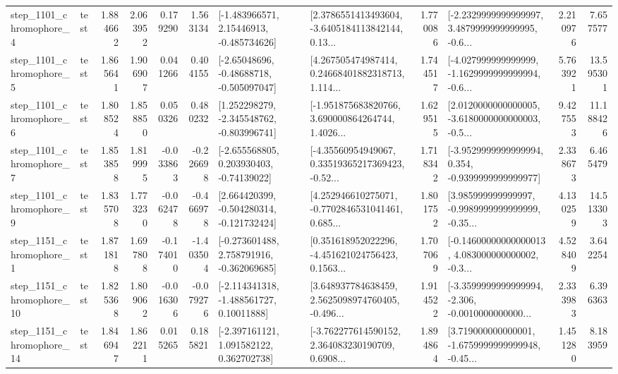 \begin{tabular}{llrrrrllrlrr}
  step\_1101\_chromophore\_4 &      test &      1.884662 &    2.063952 &      0.179290 &  1.563134 &    [-1.483966571, 2.15446913, -0.485734626] &  [2.3786551413493604, -3.6405184113842144, 0.13... &       1.770086 &  [-2.2329999999999997, 3.4879999999999995, -0.6... &            2.210976 &          7.657577 \\
  step\_1101\_chromophore\_5 &      test &      1.865641 &    1.906907 &      0.041266 &  0.404155 &    [-2.65048696, -0.48688718, -0.505097047] &  [4.267505474987414, 0.24668401882318713, 1.114... &       1.744517 &  [-4.027999999999999, -1.1629999999999994, -0.6... &            5.763921 &         13.595301 \\
  step\_1101\_chromophore\_6 &      test &      1.808524 &    1.858850 &      0.050326 &  0.480232 &   [1.252298279, -2.345548762, -0.803996741] &  [-1.951875683820766, 3.690000864264744, 1.4026... &       1.629515 &  [2.0120000000000005, -3.6180000000000003, -0.5... &            9.427553 &         11.188426 \\
  step\_1101\_chromophore\_7 &      test &      1.853858 &    1.819995 &     -0.033863 & -0.226698 &    [-2.655568805, 0.203930403, -0.74139022] &  [-4.35560954949067, 0.33519365217369423, -0.52... &       1.718342 &  [-3.9529999999999994, 0.354, -0.9399999999999977] &            2.338673 &          6.465479 \\
  step\_1101\_chromophore\_9 &      test &      1.835708 &    1.773230 &     -0.062478 & -0.466978 &   [2.664420399, -0.504280314, -0.121732424] &  [4.252946610275071, -0.7702846531041461, 0.685... &       1.801752 &  [3.985999999999997, -0.9989999999999999, -0.35... &            4.130259 &         14.513303 \\
  step\_1151\_chromophore\_1 &      test &      1.871818 &    1.697808 &     -0.174010 & -1.403504 &   [-0.273601488, 2.758791916, -0.362069685] &  [0.351618952022296, -4.451621024756423, 0.1563... &       1.707069 &  [-0.14600000000000013, 4.083000000000002, -0.3... &            4.528409 &          3.642254 \\
 step\_1151\_chromophore\_10 &      test &      1.825368 &    1.809062 &     -0.016306 & -0.079276 &    [-2.114341318, -1.488561727, 0.10011888] &  [3.648937784638459, 2.5625098974760405, -0.496... &       1.914522 &  [-3.3599999999999994, -2.306, -0.0010000000000... &            2.333983 &          6.396363 \\
 step\_1151\_chromophore\_14 &      test &      1.846947 &    1.862211 &      0.015265 &  0.185821 &    [-2.397161121, 1.091582122, 0.362702738] &  [-3.762277614590152, 2.364083230190709, 0.6908... &       1.894864 &  [3.719000000000001, -1.6759999999999948, -0.45... &            1.451280 &          8.183959 \\

\end{tabular}
